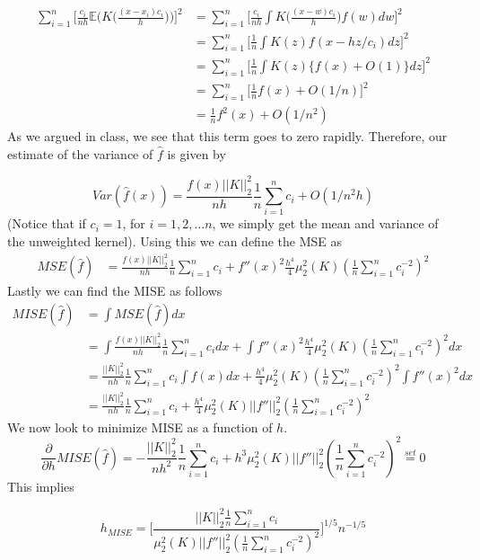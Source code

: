 \documentclass[12pt]{article}  %
\newcommand{\E}{{\mathbb{E}}}
\begin{document}
\begin{enumerate}
\begin{enumerate}
\begin{align*}
\sum_{i=1}^{n}\Big[\frac{c_i}{nh}\E\Big(K\Big(\frac{(x-x_i)c_i}{h}\Big)\Big)\Big]^2 &= \sum_{i=1}^{n}\Big[\frac{c_i}{nh}\int K\Big(\frac{(x-w)c_i}{h}\Big)f(w)dw\Big]^2\\
&=\sum_{i=1}^{n}\Big[\frac{1}{n}\int K(z)f(x - hz/c_i)dz\Big]^2\\
&=\sum_{i=1}^{n}\Big[\frac{1}{n}\int K(z)\Big\{f(x) + O(1)\Big\}dz\Big]^2\\
&=\sum_{i=1}^{n}\Big[\frac{1}{n}f(x) + O(1/n)\Big]^2\\
&= \frac{1}{n}f^{2}(x) + O(1/n^2) 
\end{align*}
As we argued in class, we see that this term goes to zero rapidly. Therefore, our estimate of the variance of $\hat{f}$ is given by 

$$Var(\widehat{f}(x)) = \frac{f(x)||K||_2^2}{nh}\frac{1}{n}\sum_{i=1}^{n}c_i + O(1/n^2h)$$ (Notice that if $c_i = 1$, for $i=1,2,\ldots n$, we simply get the mean and variance of the unweighted kernel). Using this we can define the MSE as 
\begin{align*}
MSE(\widehat{f}) &= \frac{f(x)||K||_2^2}{nh}\frac{1}{n}\sum_{i=1}^{n}c_i + f''(x)^2\frac{h^4}{4}\mu_{2}^2(K)\left(\frac{1}{n}\sum_{i=1}^{n}c_i^{-2}\right)^2
\end{align*}
Lastly we can find the MISE as follows 
\begin{align*}
MISE(\widehat{f}) &= \int MSE(\widehat{f})dx\\
&= \int \frac{f(x)||K||_2^2}{nh}\frac{1}{n}\sum_{i=1}^{n}c_i dx + \int f''(x)^2\frac{h^4}{4}\mu_{2}^2(K)\left(\frac{1}{n}\sum_{i=1}^{n}c_i^{-2}\right)^2 dx\\
&= \frac{||K||_2^2}{nh}\frac{1}{n}\sum_{i=1}^{n}c_i\int f(x)dx + \frac{h^4}{4}\mu_{2}^2(K)\left(\frac{1}{n}\sum_{i=1}^{n}c_i^{-2}\right)^2\int f''(x)^2 dx\\
&= \frac{||K||_2^2}{nh}\frac{1}{n}\sum_{i=1}^{n}c_i + \frac{h^4}{4}\mu_{2}^2(K)||f''||_2^2\left(\frac{1}{n}\sum_{i=1}^{n}c_i^{-2}\right)^2
\end{align*}
We now look to minimize MISE as a function of $h$. 
$$\frac{\partial}{\partial h}MISE(\widehat{f}) = -\frac{||K||_2^2}{nh^2}\frac{1}{n}\sum_{i=1}^{n}c_i + h^3\mu_2^2(K)||f''||_2^2\left(\frac{1}{n}\sum_{i=1}^{n}c_i^{-2}\right)^2 \overset{set}{=}0$$ This implies 

$$h_{MISE} = \bigg[\frac{||K||_2^2\frac{1}{n}\sum_{i=1}^{n}c_i}{\mu_2^2(K)||f''||_2^2\left(\frac{1}{n}\sum_{i=1}^{n}c_i^{-2}\right)^2}\Big]^{1/5}n^{-1/5}$$


\end{enumerate}
\end{enumerate}
\end{document}
